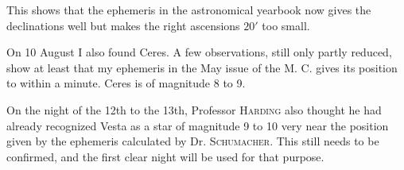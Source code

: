 \par\indent This shows that the ephemeris in the astronomical yearbook now gives the declinations well but makes the right ascensions $20'$ too small.

\par\indent On 10 August I also found Ceres. A few observations, still only partly reduced, show at least that my ephemeris in the May issue of the M. C. gives its position to within a minute. Ceres is of magnitude 8 to 9.

\par\indent On the night of the 12th to the 13th, Professor \textsc{Harding} also thought he had already recognized Vesta as a star of magnitude 9 to 10 very near the position given by the ephemeris calculated by Dr. \textsc{Schumacher}. This still needs to be confirmed, and the first clear night will be used for that purpose.

